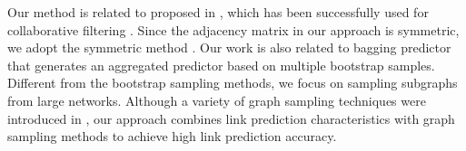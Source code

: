 Our method is related to \NMF proposed in \cite{NMF-nature99}, which
has been successfully used for collaborative
filtering \cite{web}. Since the adjacency matrix in our approach is symmetric, we adopt
the symmetric \NMF method \cite{ding}. Our work is also related
to bagging predictor \cite{Breiman96b-1996} that generates an aggregated
predictor based on multiple bootstrap samples. Different from the bootstrap
sampling methods, we focus on sampling subgraphs from large networks. Although a
variety of graph sampling techniques were introduced in \cite{ahmed2014tkdd}, our approach combines link
prediction characteristics \cite{leskovec-2008} with graph sampling
methods to achieve high link prediction accuracy.



%
%
%
%

